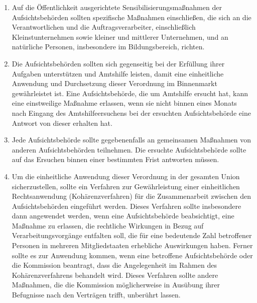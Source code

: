 \begin{enumerate}

   \item Auf die Öffentlichkeit ausgerichtete Sensibilisierungsmaßnahmen der Aufsichtsbehörden sollten spezifische
    Maßnahmen einschließen, die sich an die Verantwortlichen und die Auftragsverarbeiter, einschließlich
    Kleinstunternehmen sowie kleiner und mittlerer Unternehmen, und an natürliche Personen, insbesondere im
    Bildungsbereich, richten.%
   \label{itm:eg-132}
   

   \item Die Aufsichtsbehörden sollten sich gegenseitig bei der Erfüllung ihrer Aufgaben unterstützen und Amtshilfe
    leisten, damit eine einheitliche Anwendung und Durchsetzung dieser Verordnung im Binnenmarkt gewährleistet ist.
    Eine Aufsichtsbehörde, die um Amtshilfe ersucht hat, kann eine einstweilige Maßnahme erlassen, wenn sie nicht
    binnen eines Monats nach Eingang des Amtshilfeersuchens bei der ersuchten Aufsichtsbehörde eine Antwort von dieser
    erhalten hat.%
   \label{itm:eg-133}
   

   \item Jede Aufsichtsbehörde sollte gegebenenfalls an gemeinsamen Maßnahmen von anderen Aufsichtsbehörden teilnehmen.
    Die ersuchte Aufsichtsbehörde sollte auf das Ersuchen binnen einer bestimmten Frist antworten müssen.%
   \label{itm:eg-134}
   

   \item Um die einheitliche Anwendung dieser Verordnung in der gesamten Union sicherzustellen, sollte ein Verfahren zur
    Gewährleistung einer einheitlichen Rechtsanwendung (Kohärenzverfahren) für die Zusammenarbeit zwischen den
    Aufsichtsbehörden eingeführt werden. Dieses Verfahren sollte insbesondere dann angewendet werden, wenn eine
    Aufsichtsbehörde beabsichtigt, eine Maßnahme zu erlassen, die rechtliche Wirkungen in Bezug auf
    Verarbeitungsvorgänge entfalten soll, die für eine bedeutende Zahl betroffener Personen in mehreren Mitgliedstaaten
    erhebliche Auswirkungen haben. Ferner sollte es zur Anwendung kommen, wenn eine betroffene Aufsichtsbehörde oder
    die Kommission beantragt, dass die Angelegenheit im Rahmen des Kohärenzverfahrens behandelt wird. Dieses Verfahren
    sollte andere Maßnahmen, die die Kommission möglicherweise in Ausübung ihrer Befugnisse nach den Verträgen trifft,
    unberührt lassen.%
   \label{itm:eg-135}
   

\end{enumerate}
